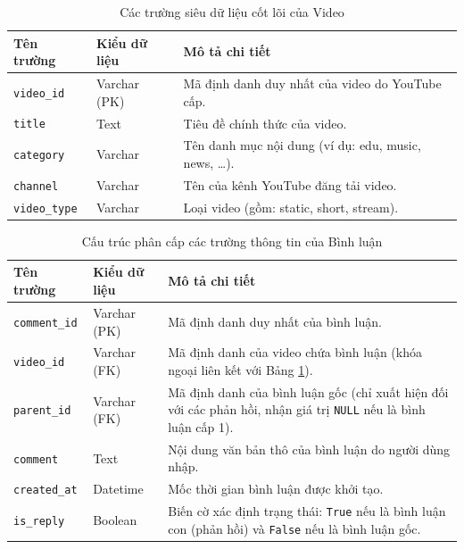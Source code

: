 \begin{table}[H]
\centering
\caption{Các trường siêu dữ liệu cốt lõi của Video}
\label{tab:video_metadata}
\begin{tabular}{|l|l|p{8cm}|}
\hline
\textbf{Tên trường} & \textbf{Kiểu dữ liệu} & \textbf{Mô tả chi tiết} \\ \hline
\texttt{video\_id}   & Varchar (PK)          & Mã định danh duy nhất của video do YouTube cấp. \\ \hline
\texttt{title}      & Text                  & Tiêu đề chính thức của video. \\ \hline
\texttt{category}   & Varchar               & Tên danh mục nội dung (ví dụ: edu, music, news, \dots). \\ \hline
\texttt{channel}    & Varchar               & Tên của kênh YouTube đăng tải video. \\ \hline
\texttt{video\_type}    & Varchar               & Loại video (gồm: static, short, stream). \\ \hline
\end{tabular}
\end{table}

\begin{table}[H]
\centering
\caption{Cấu trúc phân cấp các trường thông tin của Bình luận}
\label{tab:comment_metadata}
\begin{tabular}{|l|l|p{8cm}|}
\hline
\textbf{Tên trường} & \textbf{Kiểu dữ liệu} & \textbf{Mô tả chi tiết} \\ \hline
\texttt{comment\_id} & Varchar (PK)          & Mã định danh duy nhất của bình luận. \\ \hline
\texttt{video\_id}   & Varchar (FK)          & Mã định danh của video chứa bình luận (khóa ngoại liên kết với Bảng \ref{tab:video_metadata}). \\ \hline
\texttt{parent\_id}  & Varchar (FK)          & Mã định danh của bình luận gốc (chỉ xuất hiện đối với các phản hồi, nhận giá trị \texttt{NULL} nếu là bình luận cấp 1). \\ \hline
\texttt{comment}     & Text                  & Nội dung văn bản thô của bình luận do người dùng nhập. \\ \hline
\texttt{created\_at} & Datetime              & Mốc thời gian bình luận được khởi tạo. \\ \hline
\texttt{is\_reply}   & Boolean               & Biến cờ xác định trạng thái: \texttt{True} nếu là bình luận con (phản hồi) và \texttt{False} nếu là bình luận gốc. \\ \hline
\end{tabular}
\end{table}
